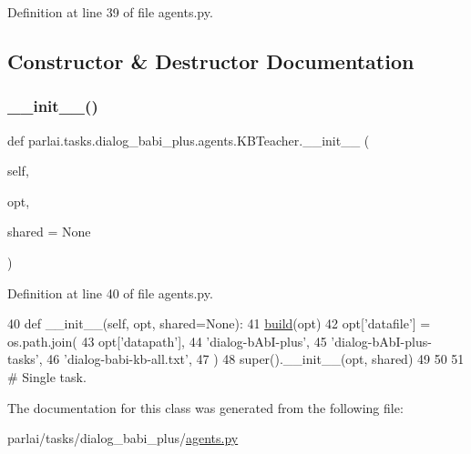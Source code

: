 Definition at line 39 of file agents.\+py.



\subsection{Constructor \& Destructor Documentation}
\mbox{\label{classparlai_1_1tasks_1_1dialog__babi__plus_1_1agents_1_1KBTeacher_aa291d9b9f60df40b085271f0dd7d3b0e}} 
\subsubsection{\texorpdfstring{\+\_\+\+\_\+init\+\_\+\+\_\+()}{\_\_init\_\_()}}
{\footnotesize\ttfamily def parlai.\+tasks.\+dialog\+\_\+babi\+\_\+plus.\+agents.\+K\+B\+Teacher.\+\_\+\+\_\+init\+\_\+\+\_\+ (\begin{DoxyParamCaption}\item[{}]{self,  }\item[{}]{opt,  }\item[{}]{shared = {\ttfamily None} }\end{DoxyParamCaption})}



Definition at line 40 of file agents.\+py.


\begin{DoxyCode}
40     \textcolor{keyword}{def }\_\_init\_\_(self, opt, shared=None):
41         \hyperlink{namespaceparlai_1_1mturk_1_1tasks_1_1talkthewalk_1_1download_a8c0fbb9b6dfe127cb8c1bd6e7c4e33fd}{build}(opt)
42         opt[\textcolor{stringliteral}{'datafile'}] = os.path.join(
43             opt[\textcolor{stringliteral}{'datapath'}],
44             \textcolor{stringliteral}{'dialog-bAbI-plus'},
45             \textcolor{stringliteral}{'dialog-bAbI-plus-tasks'},
46             \textcolor{stringliteral}{'dialog-babi-kb-all.txt'},
47         )
48         super().\_\_init\_\_(opt, shared)
49 
50 
51 \textcolor{comment}{# Single task.}
\end{DoxyCode}


The documentation for this class was generated from the following file\+:\begin{DoxyCompactItemize}
\item 
parlai/tasks/dialog\+\_\+babi\+\_\+plus/\hyperlink{parlai_2tasks_2dialog__babi__plus_2agents_8py}{agents.\+py}\end{DoxyCompactItemize}
